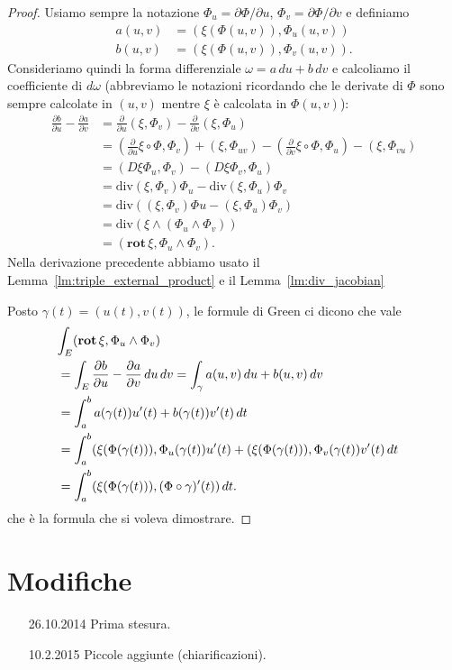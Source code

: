 \documentclass[italian,a4paper]{scrartcl}
\newcommand{\defeq}{=}
\renewcommand{\div}{\mathrm{div}}
\newcommand{\rot}{\mathbf{rot}\,}
\begin{document}
\begin{proof}
Usiamo sempre la notazione $\Phi_u = \partial \Phi/\partial u$,
$\Phi_v = \partial \Phi/\partial v$ e definiamo
\begin{align*}
a(u,v) &\defeq \left(\xi(\Phi(u,v)),\Phi_u(u,v)\right)\\
b(u,v) &\defeq \left(\xi(\Phi(u,v)),\Phi_v(u,v)\right).
\end{align*}
Consideriamo quindi la forma differenziale $\omega = a\, du + b\, dv$
e calcoliamo il coefficiente di $d\omega$ (abbreviamo le notazioni
ricordando che le derivate di $\Phi$ sono sempre calcolate in $(u,v)$
mentre $\xi$ è calcolata in $\Phi(u,v)$):
\begin{align*}
\frac{\partial b}{\partial u} - \frac{\partial a}{\partial v}
& = \frac{\partial}{\partial u}(\xi,\Phi_v) -\frac{\partial}{\partial
  v}(\xi,\Phi_u)\\
& = \left(\frac{\partial}{\partial u} \xi\circ \Phi, \Phi_v\right) +
  (\xi,\Phi_{uv}) - \left(\frac{\partial}{\partial v} \xi \circ \Phi,
  \Phi_u\right)
  -(\xi,\Phi_{vu})\\
& = (D\xi \Phi_u, \Phi_v)-(D\xi \Phi_v,\Phi_u)\\
& = \div (\xi,\Phi_v) \Phi_u - \div (\xi,\Phi_u) \Phi_v\\
& = \div ( (\xi,\Phi_v) \Phi u - (\xi,\Phi_u) \Phi_v)\\
& = \div (\xi \wedge (\Phi_u \wedge \Phi_v))\\
& = (\rot \xi, \Phi_u\wedge \Phi_v).
\end{align*}
Nella derivazione precedente abbiamo usato il
Lemma~\ref{lm:triple_external_product} e il Lemma~\ref{lm:div_jacobian}

Posto $\gamma(t) = (u(t),v(t))$, 
le formule di Green ci dicono che vale
\begin{align*}
\lefteqn{\int_E (\rot \xi, \Phi_u \wedge \Phi_v)}\\
 & = \int_E  \frac{\partial b}{\partial u} - \frac{\partial
   a}{\partial v}\, du\,dv
  = \int_{\gamma} a(u,v)\, du + b(u,v)\, dv\\
 & = \int_a^b a(\gamma(t)) u'(t) + b(\gamma(t))v'(t) \, dt\\
 & = \int_a^b (\xi(\Phi(\gamma(t))), \Phi_u(\gamma(t)) u'(t)
     + (\xi(\Phi(\gamma(t))), \Phi_v(\gamma(t)) v'(t)\,
 dt \\
 & = \int_a^b (\xi(\Phi(\gamma(t))), (\Phi\circ\gamma)'(t))\, dt.
\end{align*}
che è la formula che si voleva dimostrare.
\end{proof}

\section*{Modifiche}
\begin{itemize}
\item[26.10.2014] Prima stesura.
\item[10.2.2015] Piccole aggiunte (chiarificazioni).
\end{itemize}
\end{document}
